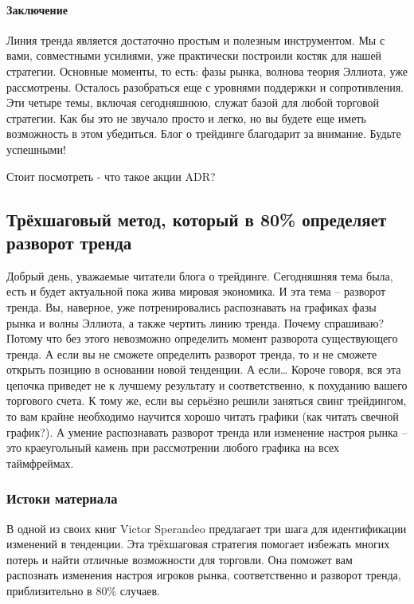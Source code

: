 \documentclass{book}
\begin{document}
\paragraph{Заключение}

Линия тренда является достаточно простым и полезным инструментом. Мы с вами, совместными усилиями, уже практически построили костяк для нашей стратегии. Основные моменты, то есть: фазы рынка, волнова теория Эллиота, уже рассмотрены. Осталось разобраться еще с уровнями поддержки и сопротивления. Эти четыре темы, включая сегодняшнюю, служат базой для любой торговой стратегии. Как бы это не звучало просто и легко, но вы будете еще иметь возможность в этом убедиться. Блог о трейдинге благодарит за внимание. Будьте успешными!


Стоит посмотреть - что такое акции ADR?

\subsection{Трёхшаговый метод, который в 80\% определяет разворот
  тренда}

Добрый день, уважаемые читатели блога о трейдинге. Сегодняшняя тема
была, есть и будет актуальной пока жива мировая экономика. И эта тема
– разворот тренда. Вы, наверное, уже потренировались распознавать на
графиках фазы рынка и волны Эллиота, а также чертить линию
тренда. Почему спрашиваю? Потому что без этого невозможно определить
момент разворота существующего  тренда. А если вы не сможете
определить разворот тренда, то и не сможете открыть позицию в
основании новой тенденции. А если… Короче говоря, вся эта цепочка
приведет не к лучшему результату и соответственно, к похуданию вашего
торгового счета. К тому же, если вы серьёзно решили заняться свинг
трейдингом, то вам крайне необходимо научится хорошо читать графики
(как читать свечной график?). А умение распознавать разворот тренда
или изменение настроя рынка – это краеугольный камень при рассмотрении
любого графика на всех таймфреймах.

\subsubsection{Истоки материала}

В одной из своих книг Victor Sperandeo предлагает три шага для идентификации изменений в тенденции. Эта трёхшаговая стратегия помогает избежать многих потерь и найти отличные возможности для торговли. Она поможет вам распознать изменения настроя игроков рынка, соответственно и разворот тренда, приблизительно в 80\% случаев.
\end{document}
